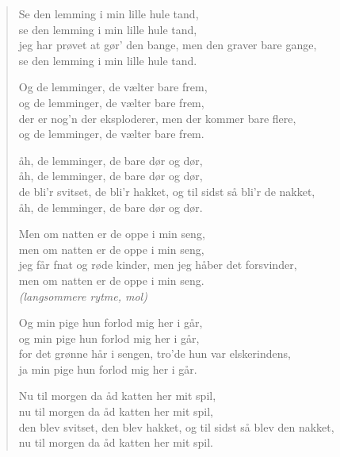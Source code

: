 \documentclass[a4paper,11pt]{article}
\begin{document}
\begin{verse}
\medskip

Se den lemming i min lille hule tand,\\
se den lemming i min lille hule tand,\\
jeg har prøvet at gør' den bange, men den graver bare gange,\\
se den lemming i min lille hule tand.\\

\medskip

Og de lemminger, de vælter bare frem,\\
og de lemminger, de vælter bare frem,\\
der er nog'n der eksploderer, men der kommer bare flere,\\
og de lemminger, de vælter bare frem.\\

\medskip

åh, de lemminger, de bare dør og dør,\\
åh, de lemminger, de bare dør og dør,\\
de bli'r svitset, de bli'r hakket, og til sidst så bli'r de nakket,\\
åh, de lemminger, de bare dør og dør.\\

\medskip

Men om natten er de oppe i min seng,\\
men om natten er de oppe i min seng,\\
jeg får fnat og røde kinder, men jeg håber det forsvinder,\\
men om natten er de oppe i min seng.\\

\smallskip
{\em (langsommere rytme, mol)}
\smallskip

Og min pige hun forlod mig her i går,\\
og min pige hun forlod mig her i går,\\
for det grønne hår i sengen, tro'de hun var elskerindens,\\
ja min pige hun forlod mig her i går.\\

\medskip

Nu til morgen da åd katten her mit spil,\\
nu til morgen da åd katten her mit spil,\\
den blev svitset, den blev hakket, og til sidst så blev den nakket,\\
nu til morgen da åd katten her mit spil.\\

\end{verse}
\end{document}
